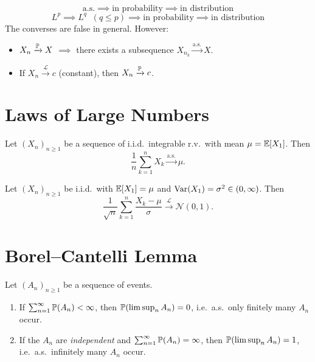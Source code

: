\begin{keyformulas}[title=\textbf{Hierarchy of Convergences}]
\[
  \text{a.s.} \implies \text{in probability} \implies \text{in distribution}
\]
\[
  L^p \implies L^q \;\;(q \leq p) \implies \text{in probability} \implies \text{in distribution}
\]
The converses are false in general. However:
\begin{itemize}
  \item $X_n \xrightarrow{\mathbb{P}} X$ $\implies$ there exists a subsequence $X_{n_k} \xrightarrow{\text{a.s.}} X$.
  \item If $X_n \xrightarrow{\mathcal{L}} c$ (constant), then $X_n \xrightarrow{\mathbb{P}} c$.
\end{itemize}
\end{keyformulas}

\section{Laws of Large Numbers}

\begin{theorem}
\label{thm:slln}
Let $(X_n)_{n \geq 1}$ be a sequence of i.i.d.\ integrable r.v.\ with mean
$\mu = \mathbb{E}[X_1]$. Then
\[
  \frac{1}{n} \sum_{k=1}^{n} X_k \xrightarrow{\text{a.s.}} \mu.
\]
\end{theorem}

\begin{theorem}
\label{thm:clt}
Let $(X_n)_{n \geq 1}$ be i.i.d.\ with $\mathbb{E}[X_1] = \mu$ and
$\mathrm{Var}(X_1) = \sigma^2 \in (0, \infty)$. Then
\[
  \frac{1}{\sqrt{n}} \sum_{k=1}^{n} \frac{X_k - \mu}{\sigma}
  \xrightarrow{\mathcal{L}} \mathcal{N}(0, 1).
\]
\end{theorem}

\section{Borel--Cantelli Lemma}

\begin{theorem}
\label{thm:borel_cantelli}
Let $(A_n)_{n \geq 1}$ be a sequence of events.
\begin{enumerate}
  \item If $\sum_{n=1}^{\infty} \mathbb{P}(A_n) < \infty$, then
    $\mathbb{P}(\limsup_{n} A_n) = 0$, i.e.\ a.s.\ only finitely many $A_n$ occur.
  \item If the $A_n$ are \emph{independent} and $\sum_{n=1}^{\infty} \mathbb{P}(A_n) = \infty$,
    then $\mathbb{P}(\limsup_{n} A_n) = 1$, i.e.\ a.s.\ infinitely many $A_n$ occur.
\end{enumerate}
\end{theorem}

